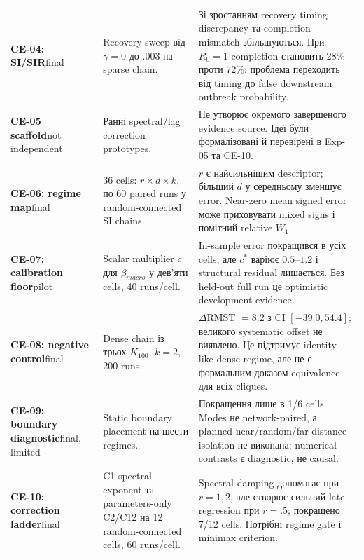 \documentclass[11pt,a4paper]{article}
\begin{document}
\begin{longtable}{p{2.25cm}p{5.25cm}p{6.15cm}}
\textbf{CE-04: SI/SIR}\newline final
& Recovery sweep від $\gamma=0$ до $.003$ на sparse chain.
& Зі зростанням recovery timing discrepancy та completion mismatch збільшуються. При $R_0=1$ completion становить $28\%$ проти $72\%$: проблема переходить від timing до false downstream outbreak probability.\\

\textbf{CE-05 scaffold}\newline not independent
& Ранні spectral/lag correction prototypes.
& Не утворює окремого завершеного evidence source. Ідеї були формалізовані й перевірені в Exp-05 та CE-10.\\

\textbf{CE-06: regime map}\newline final
& 36 cells: $r\times d\times k$, по 60 paired runs у random-connected SI chains.
& $r$ є найсильнішим descriptor; більший $d$ у середньому зменшує error. Near-zero mean signed error може приховувати mixed signs і помітний relative $W_1$.\\

\textbf{CE-07: calibration floor}\newline pilot
& Scalar multiplier $c$ для $\beta_{macro}$ у дев'яти cells, 40 runs/cell.
& In-sample error покращився в усіх cells, але $c^*$ варіює $0.5$--$1.2$ і structural residual лишається. Без held-out full run це optimistic development evidence.\\

\textbf{CE-08: negative control}\newline final
& Dense chain із трьох $K_{100}$, $k=2$, 200 runs.
& $\Delta$RMST $=8.2$ з CI $[-39.0,54.4]$; великого systematic offset не виявлено. Це підтримує identity-like dense regime, але не є формальним доказом equivalence для всіх cliques.\\

\textbf{CE-09: boundary diagnostic}\newline final, limited
& Static boundary placement на шести regimes.
& Покращення лише в 1/6 cells. Modes не network-paired, а planned near/random/far distance isolation не виконана; numerical contrasts є diagnostic, не causal.\\

\textbf{CE-10: correction ladder}\newline final
& C1 spectral exponent та parameters-only C2/C12 на 12 random-connected cells, 60 runs/cell.
& Spectral damping допомагає при $r=1,2$, але створює сильний late regression при $r=.5$; покращено 7/12 cells. Потрібні regime gate і minimax criterion.\\


\end{longtable}
\end{document}
